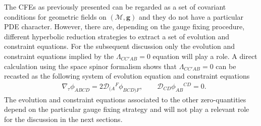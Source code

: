\documentclass[10pt,a4paper]{article}
\theoremstyle{plain}
\def\bmg{{\bm g}}
\begin{document}
{The CFEs as previously presented can be regarded as a set of covariant
conditions for geometric fields on $(\mathcal{M},\bmg)$ and they do
not have a particular PDE character.  However, there are, depending on
the gauge fixing procedure, different hyperbolic reduction strategies
to extract a set of evolution and constraint equations.
For the subsequent discussion only the evolution and constraint equations
implied by the $\Lambda_{CC'AB}=0$ equation will play a role.
A direct calculation using the space spinor formalism shows that
$\Lambda_{CC'AB}=0$ can be recasted as the following system of evolution equation and
constraint equations
\begin{align}\label{RescaledWeyl_evo_const}
  & \nabla_\tau \phi _{ABCD} =  2 \mathcal{D} _{(A}{}^{F}\phi _{BCD)F}, %
  \qquad \mathcal{D} _{CD}\phi _{AB}{}^{CD} = 0. 
\end{align}
The evolution and constraint equations associated to the
other zero-quantities depend on the particular gauge fixing strategy
and will not play a relevant role for the discussion in the next sections.

\medskip

}
\end{document}
